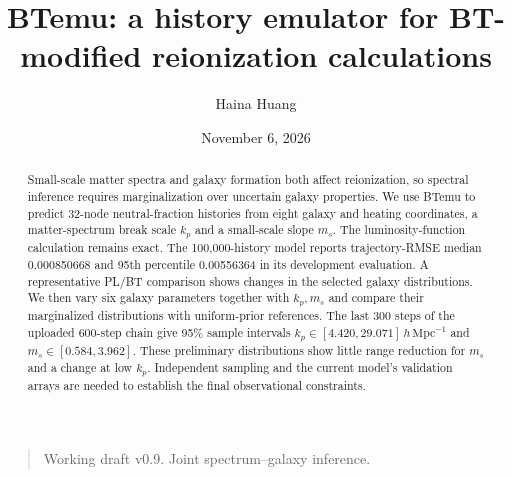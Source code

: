 \documentclass[reprint,superscriptaddress,nofootinbib,nobibnotes,amsmath,amssymb,aps,prd,floatfix,longbibliography]{revtex4-2}
\def\btemubody{body.tex}
\begin{document}
\title{BTemu: a history emulator for BT-modified reionization calculations}
\author{Haina Huang}
\date{November 6, 2026}
\begin{abstract}
Small-scale matter spectra and galaxy formation both affect reionization, so spectral inference requires marginalization over uncertain galaxy properties. We use BTemu to predict 32-node neutral-fraction histories from eight galaxy and heating coordinates, a matter-spectrum break scale $k_p$ and a small-scale slope $m_s$. The luminosity-function calculation remains exact. The 100,000-history model reports trajectory-RMSE median 0.000850668 and 95th percentile 0.00556364 in its development evaluation. A representative PL/BT comparison shows changes in the selected galaxy distributions. We then vary six galaxy parameters together with $k_p,m_s$ and compare their marginalized distributions with uniform-prior references. The last 300 steps of the uploaded 600-step chain give 95\% sample intervals $k_p\in[4.420,29.071]\,h\,\mathrm{Mpc}^{-1}$ and $m_s\in[0.584,3.962]$. These preliminary distributions show little range reduction for $m_s$ and a change at low $k_p$. Independent sampling and the current model's validation arrays are needed to establish the final observational constraints.
\end{abstract}
\maketitle
\begin{quote}\small Working draft v0.9. Joint spectrum--galaxy inference.\end{quote}

\end{document}
